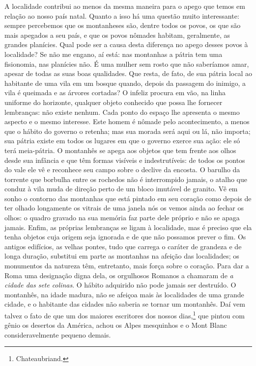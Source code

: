  A localidade contribui ao menos da mesma maneira para o apego que temos
em relação ao nosso país natal. Quanto a isso há uma questão muito
interessante: sempre percebemos que os montanheses são, dentre todos os
povos, os que são mais apegados a seu país, e que os povos nômades
habitam, geralmente, as grandes planícies. Qual pode ser a causa desta
diferença no apego desses povos à localidade? Se não me engano, aí
está: nas montanhas a pátria tem uma fisionomia, nas planícies não. É
uma mulher sem rosto que não saberíamos amar, apesar de todas as suas
boas qualidades. Que resta, de fato, de sua pátria local ao habitante
de uma vila em um bosque quando, depois da passagem do inimigo, a vila
é queimada e as árvores cortadas? O infeliz procura em vão, na linha
uniforme do horizonte, qualquer objeto conhecido que possa lhe fornecer
lembranças: não existe nenhum. Cada ponto do espaço lhe apresenta o
mesmo aspecto e o mesmo interesse. Este homem é nômade pelo
acontecimento, a menos que o hábito do governo o retenha; mas sua
morada será aqui ou lá, não importa; sua pátria existe em todos os
lugares em que o governo exerce sua ação: ele só terá meia-pátria.
O montanhês se apega aos objetos que tem frente aos olhos desde sua
infância e que têm formas visíveis e indestrutíveis: de todos os pontos
do vale ele vê e reconhece seu campo sobre o declive da encosta. O
barulho da torrente que borbulha entre os rochedos não é interrompido
jamais, o atalho que conduz à vila muda de direção perto de um bloco
imutável de granito. Vê em sonho o contorno das montanhas que está
pintado em seu coração como depois de ter olhado longamente os vitrais
de uma janela nós os vemos ainda ao fechar os olhos: o quadro gravado
na sua memória faz parte dele próprio e não se apaga jamais. Enfim, as
próprias lembranças se ligam à localidade, mas é preciso que ela tenha
objetos cuja origem seja ignorada e de que não possamos prever o fim.
Os antigos edifícios, as velhas pontes, tudo que carrega o caráter de
grandeza e de longa duração, substitui em parte as montanhas na afeição
das localidades; os monumentos da natureza têm, entretanto, mais força
sobre o coração. Para dar a Roma uma designação digna dela, os
orgulhosos Romanos a chamaram de \textit{a cidade das sete
}\textit{colinas}. O hábito adquirido não pode jamais ser destruído. O
montanhês, na idade madura, não se afeiçoa mais às localidades de uma
grande cidade, e o habitante das cidades não saberia se tornar um
montanhês. Daí vem talvez o fato de que um dos maiores escritores dos
nossos dias,\footnote{ Chateaubriand.} que pintou com gênio os
desertos da América, achou os Alpes mesquinhos e o Mont Blanc
consideravelmente pequeno demais.

